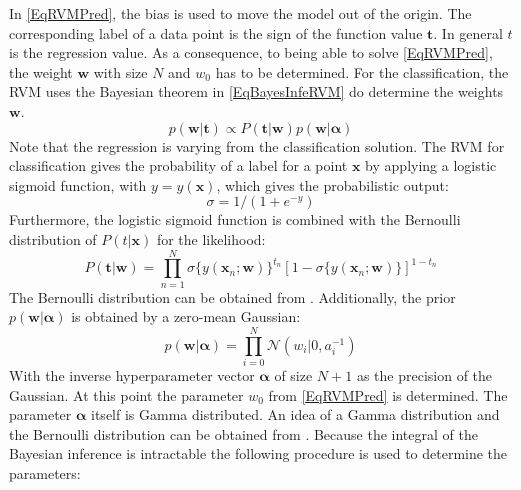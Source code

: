 In \eqref{EqRVMPred}, the bias is used to move the model out of the origin.
The corresponding label of a data point is the sign of the function value $\mathbf{t}$.
In general $t$ is the regression value. \cite[p. 662]{Theodoridis.2015} \newline
As a consequence, to being able to solve \eqref{EqRVMPred}, the weight $\mathbf{w}$ with size $N$ and $w_0$ has to be determined.
For the classification, the \acs{RVM} uses the Bayesian theorem in \eqref{EqBayesInfeRVM} do determine the weights $\mathbf{w}$. 
\begin{equation}\label{EqBayesInfeRVM}
	p( \mathbf{w}\vert \mathbf{t} ) \propto P(\mathbf{t}\vert \mathbf{w}) p(\mathbf{w} \vert \boldsymbol{\alpha})
\end{equation}
Note that the regression is varying from the classification solution.
The \ac{RVM} for classification gives the probability of a label for a point $\mathbf{x}$ by applying a logistic sigmoid function, with $y=y(\mathbf{x})$, which gives the probabilistic output:
\begin{equation}\label{EqLogSig}
	\sigma=1/(1+e^{-y}) 
\end{equation}
Furthermore, the logistic sigmoid function is combined with the Bernoulli distribution of $P(t\vert \mathbf{x})$ for the likelihood:
\begin{equation}\label{EqRVMLikelihood}
	P(\mathbf{t}\vert\mathbf{w})=\prod_{n=1}^{N}\sigma\{y(\mathbf{x}_n;\mathbf{w})\}^{t_n}[1-\sigma\{y(\mathbf{x}_n;\mathbf{w})\}]^{1-t_n}
\end{equation}
The Bernoulli distribution can be obtained from \cite[p. 685]{Bishop.2009} .
Additionally, the prior $p(\mathbf{w} \vert \boldsymbol{\alpha})$ is obtained by a zero-mean Gaussian:
\begin{equation}\label{EqRVMPrior}
	p(\mathbf{w} \vert \boldsymbol{\alpha}) = \prod_{i=0}^{N}\mathcal{N}(w_i\vert 0,a_i^{-1})
\end{equation}
With the inverse hyperparameter vector $\boldsymbol{\alpha}$ of size $N+1$ as the precision of the Gaussian.
At this point the parameter $w_0$ from \eqref{EqRVMPred} is determined.
The parameter $\boldsymbol{\alpha}$ itself is Gamma distributed.\cite[p. 214-215, 218-219]{Tipping.2001}\newline
An idea of a Gamma distribution and the Bernoulli distribution can be obtained from \cite[p.686-688]{Bishop.2009}.\newline
Because the integral of the Bayesian inference is intractable the following procedure is used to determine the parameters:
